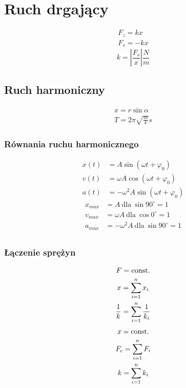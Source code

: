 \chapter{Ruch drgający}
  \begin{gather}
    F_z = kx\\
    F_s = -kx
  \end{gather}
  \begin{equation}
    k = \left|\frac{F_s}{x}\right| \unit{\frac Nm}
  \end{equation}
  \section{Ruch harmoniczny}
    \begin{gather}
      x = r\sin\alpha\\
      T = 2\pi\sqrt{\frac mk} \unit{s}
    \end{gather}
    \subsection{Równania ruchu harmonicznego}
      \begin{align}
        x(t) &= A\sin(\omega t + \varphi_0)\\
        v(t) &= \omega A\cos(\omega t + \varphi_0)\\
        a(t) &= -\omega^2A\sin(\omega t + \varphi_0)
      \end{align}
      \begin{align}
        x_{max} &= A\ \text{dla}\ \sin90^\circ = 1\\
        v_{max} &= \omega A\ \text{dla}\ \cos0^\circ = 1\\
        a_{max} &= -\omega^2A\ \text{dla}\ \sin90^\circ = 1\\
      \end{align}
    \subsection{Łączenie sprężyn}
      \begin{gather}
        F = \operatorname{const.}\\
        x = \sum_{i=1}^n x_i\\
        \frac{1}{k} = \sum_{i=1}^n \frac{1}{k_i}
      \end{gather}
      \begin{gather}
        x = \operatorname{const.}\\
        F_c = \sum_{i=1}^n F_i\\
        k = \sum_{i=1}^n k_i
      \end{gather}
